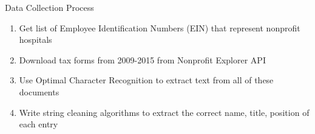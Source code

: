 \documentclass[notes,11pt, aspectratio=169]{beamer}
\begin{document}
\begin{frame}{}
\end{frame}

\begin{frame}{Data Collection Process}
    \begin{enumerate}
        \item Get list of Employee Identification Numbers (EIN) that represent nonprofit hospitals

        \vspace{5mm}
        \item Download tax forms from 2009-2015 from Nonprofit Explorer API

        \vspace{5mm}
        \item Use Optimal Character Recognition to extract text from all of these documents

        \vspace{5mm}
        \item Write string cleaning algorithms to extract the correct name, title, position of each entry
    \end{enumerate}
\end{frame}
\end{document}
